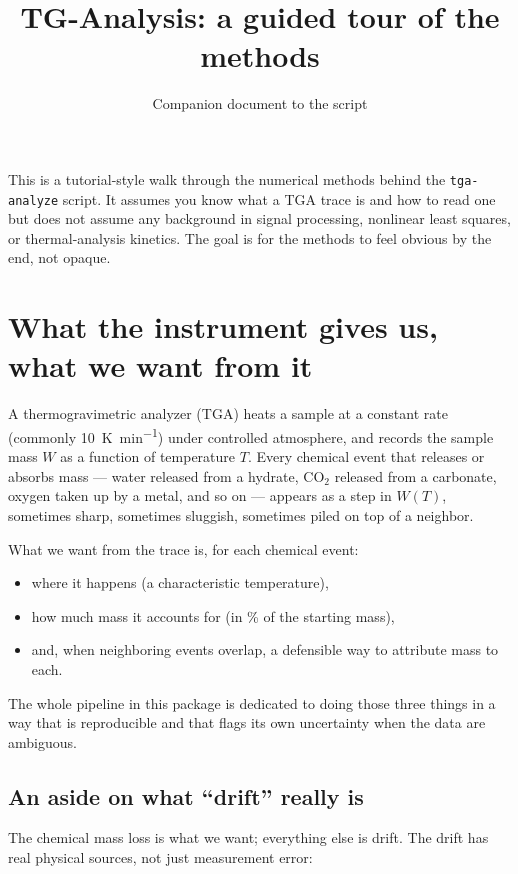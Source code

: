 \documentclass[11pt]{article}
\title{TG-Analysis: a guided tour of the methods}
\author{Companion document to the \code{tga-analyze} script}
\date{}
\newcommand{\code}[1]{\texttt{#1}}
\begin{document}
\maketitle

\noindent
This is a tutorial-style walk through the numerical methods behind the
\code{tga-analyze} script. It assumes you know what a TGA trace is and
how to read one but does not assume any background in signal processing,
nonlinear least squares, or thermal-analysis kinetics. The goal is for
the methods to feel obvious by the end, not opaque.

\tableofcontents

\section{What the instrument gives us, what we want from it}

A thermogravimetric analyzer (TGA) heats a sample at a constant rate
(commonly \qty{10}{\kelvin\per\minute}) under controlled atmosphere, and records
the sample mass $W$ as a function of temperature $T$. Every chemical
event that releases or absorbs mass --- water released from a hydrate,
$\mathrm{CO}_2$ released from a carbonate, oxygen taken up by a metal,
and so on --- appears as a step in $W(T)$, sometimes sharp, sometimes
sluggish, sometimes piled on top of a neighbor.

What we want from the trace is, for each chemical event:
\begin{itemize}
  \item where it happens (a characteristic temperature),
  \item how much mass it accounts for (in \% of the starting mass),
  \item and, when neighboring events overlap, a defensible way to
        attribute mass to each.
\end{itemize}

The whole pipeline in this package is dedicated to doing those three
things in a way that is reproducible and that flags its own
uncertainty when the data are ambiguous.

\subsection*{An aside on what ``drift'' really is}

The chemical mass loss is what we want; everything else is drift. The
drift has real physical sources, not just measurement error:
\end{document}
